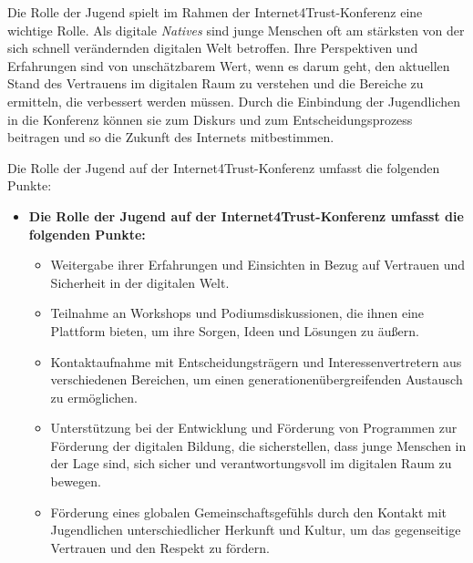 Die Rolle der Jugend spielt im Rahmen der Internet4Trust-Konferenz eine wichtige Rolle. Als digitale \textit{Natives} sind junge Menschen oft am stärksten von der sich schnell verändernden digitalen Welt betroffen. Ihre Perspektiven und Erfahrungen sind von unschätzbarem Wert, wenn es darum geht, den aktuellen Stand des Vertrauens im digitalen Raum zu verstehen und die Bereiche zu ermitteln, die verbessert werden müssen. Durch die Einbindung der Jugendlichen in die Konferenz können sie zum Diskurs und zum Entscheidungsprozess beitragen und so die Zukunft des Internets mitbestimmen.


Die Rolle der Jugend auf der Internet4Trust-Konferenz umfasst die folgenden Punkte:

\begin{itemize}
    \item \textbf{Die Rolle der Jugend auf der Internet4Trust-Konferenz umfasst die folgenden Punkte:}
          \begin{itemize}
              \item {Weitergabe ihrer Erfahrungen und Einsichten in Bezug auf Vertrauen und Sicherheit in der digitalen Welt.}
              \item {Teilnahme an Workshops und Podiumsdiskussionen, die ihnen eine Plattform bieten, um ihre Sorgen, Ideen und Lösungen zu äußern.}
              \item {Kontaktaufnahme mit Entscheidungsträgern und Interessenvertretern aus verschiedenen Bereichen, um einen generationenübergreifenden Austausch zu ermöglichen.}
              \item {Unterstützung bei der Entwicklung und Förderung von Programmen zur Förderung der digitalen Bildung, die sicherstellen, dass junge Menschen in der Lage sind, sich sicher und verantwortungsvoll im digitalen Raum zu bewegen.}
              \item {Förderung eines globalen Gemeinschaftsgefühls durch den Kontakt mit Jugendlichen unterschiedlicher Herkunft und Kultur, um das gegenseitige Vertrauen und den Respekt zu fördern.}
          \end{itemize}
\end{itemize}

